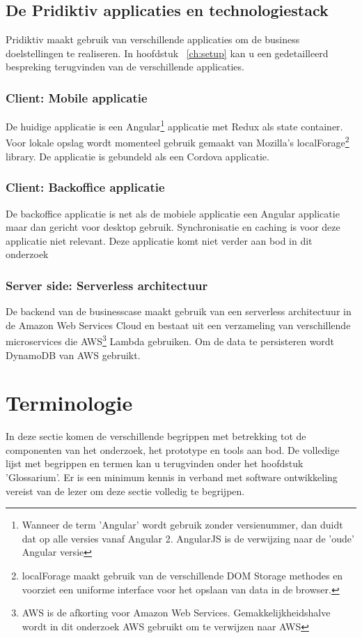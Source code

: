 \subsection{De Pridiktiv applicaties en technologiestack}
Pridiktiv maakt gebruik van verschillende applicaties om de business doelstellingen te realiseren. In hoofdstuk ~\ref{ch:setup} kan u een gedetailleerd bespreking terugvinden van de verschillende applicaties.
\subsubsection{Client: Mobile applicatie}
De huidige applicatie is een Angular\footnote{Wanneer de term 'Angular' wordt gebruik zonder versienummer, dan duidt dat op alle versies vanaf Angular 2. AngularJS is de verwijzing naar de 'oude' Angular versie} applicatie met Redux als state container. Voor lokale opslag wordt momenteel gebruik gemaakt van Mozilla's localForage\footnote{localForage maakt gebruik van de verschillende DOM Storage methodes en voorziet een uniforme interface voor het opslaan van data in de browser.} library. De applicatie is gebundeld als een Cordova applicatie.
\subsubsection{Client: Backoffice applicatie}
De backoffice applicatie is net als de mobiele applicatie een Angular applicatie maar dan gericht voor desktop gebruik. Synchronisatie en caching is voor deze applicatie niet relevant. Deze applicatie komt niet verder aan bod in dit onderzoek
\clearpage
\subsubsection{Server side: Serverless architectuur}
De backend van de businesscase maakt gebruik van een serverless architectuur in de Amazon Web Services Cloud en bestaat uit een verzameling van verschillende microservices die AWS\footnote{AWS is de afkorting voor Amazon Web Services. Gemakkelijkheidshalve wordt in dit onderzoek AWS gebruikt om te verwijzen naar AWS} Lambda gebruiken. Om de data te persisteren wordt DynamoDB van AWS gebruikt.
\section{Terminologie}
\label{sec:terminologie}
In deze sectie komen de verschillende begrippen met betrekking tot de componenten van het onderzoek, het prototype en tools aan bod. De volledige lijst met begrippen en termen kan u terugvinden onder het hoofdstuk 'Glossarium'. Er is een minimum kennis in verband met software ontwikkeling vereist van de lezer om deze sectie volledig te begrijpen.
